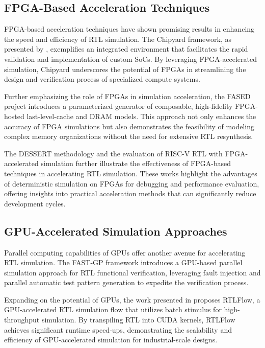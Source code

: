 \documentclass[conference]{IEEEtran}
\begin{document}
\subsection{FPGA-Based Acceleration Techniques}

FPGA-based acceleration techniques have shown promising results in enhancing the speed and efficiency of RTL simulation. The Chipyard framework, as presented by \cite{amidChipyardIntegratedDesign2020}, exemplifies an integrated environment that facilitates the rapid validation and implementation of custom SoCs. By leveraging FPGA-accelerated simulation, Chipyard underscores the potential of FPGAs in streamlining the design and verification process of specialized compute systems.

Further emphasizing the role of FPGAs in simulation acceleration, the FASED project \cite{biancolinFASEDFPGAAcceleratedSimulation2019} introduces a parameterized generator of composable, high-fidelity FPGA-hosted last-level-cache and DRAM models. This approach not only enhances the accuracy of FPGA simulations but also demonstrates the feasibility of modeling complex memory organizations without the need for extensive RTL resynthesis.

The DESSERT methodology \cite{kimDebuggingRISCVProcessors, kimDESSERTDebuggingRTL2018} and the evaluation of RISC-V RTL with FPGA-accelerated simulation \cite{kimEvaluationRISCVRTL} further illustrate the effectiveness of FPGA-based techniques in accelerating RTL simulation. These works highlight the advantages of deterministic simulation on FPGAs for debugging and performance evaluation, offering insights into practical acceleration methods that can significantly reduce development cycles.

\subsection{GPU-Accelerated Simulation Approaches}

Parallel computing capabilities of GPUs offer another avenue for accelerating RTL simulation. The FAST-GP framework \cite{bombieriFASTGPRTLFunctional2012} introduces a GPU-based parallel simulation approach for RTL functional verification, leveraging fault injection and parallel automatic test pattern generation to expedite the verification process.

Expanding on the potential of GPUs, the work presented in \cite{linRTLCUDAGPU2022a} proposes RTLFlow, a GPU-accelerated RTL simulation flow that utilizes batch stimulus for high-throughput simulation. By transpiling RTL into CUDA kernels, RTLFlow achieves significant runtime speed-ups, demonstrating the scalability and efficiency of GPU-accelerated simulation for industrial-scale designs.
\end{document}
